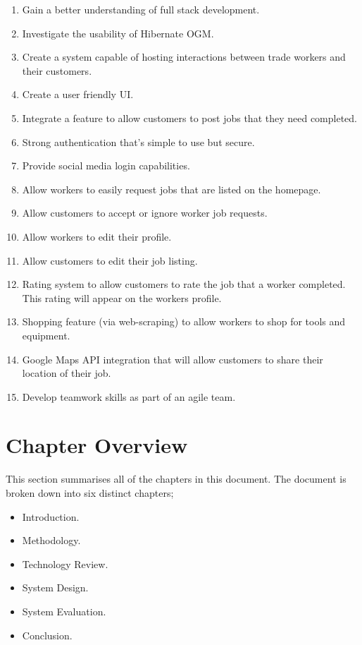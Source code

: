\begin{enumerate}
    
    \item Gain a better understanding of full stack development.
    \item Investigate the usability of Hibernate OGM.
    \item Create a system capable of hosting interactions between trade workers and their customers.
    \item Create a user friendly UI.
    \item Integrate a feature to allow customers to post jobs that they need completed.
    \item Strong authentication that’s simple to use but secure.
    \item Provide social media login capabilities.
    \item Allow workers to easily request jobs that are listed on the homepage.
    \item Allow customers to accept or ignore worker job requests.
    \item Allow workers to edit their profile.
    \item Allow customers to edit their job listing.
    \item Rating system to allow customers to rate the job that a worker completed. This rating will appear on the workers profile.
    \item Shopping feature (via web-scraping) to allow workers to shop for tools and equipment.
    \item Google Maps API integration that will allow customers to share their location of their job.
    \item Develop teamwork skills as part of an agile team.
    
\end{enumerate}

\section{Chapter Overview}
\label{sec:IntroductionOverview}
This section summarises all of the chapters in this document. The document is broken down into six distinct chapters;

\begin{itemize}
    \item Introduction.
    \item Methodology.
    \item Technology Review.
    \item System Design.
    \item System Evaluation.
    \item Conclusion.
\end{itemize}

